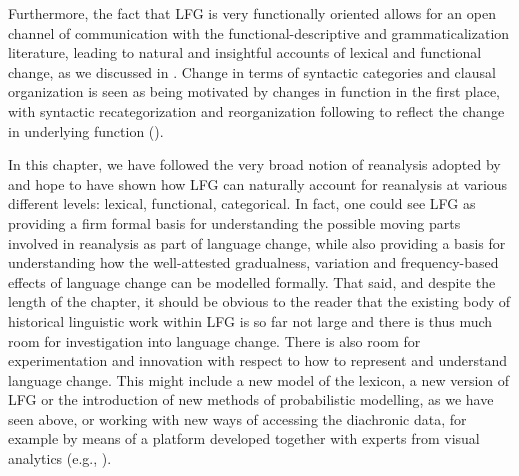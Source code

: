 \documentclass[output=paper,hidelinks]{langscibook}
\begin{document}
Furthermore, the fact that LFG is very functionally oriented allows for an open channel of communication with the functional-descriptive and grammaticalization literature, leading to natural and insightful  accounts of lexical and functional change, as we discussed in . Change in terms of syntactic categories and clausal organization is seen as being motivated by changes in function in the first place, with syntactic recategorization and reorganization following to reflect the change in underlying function ().


In this chapter, we have followed the very broad notion of reanalysis adopted by \citet{harris1995historical} and hope to have shown how LFG can naturally account for reanalysis at various different levels: lexical, functional, categorical. In fact, one could see LFG as providing a firm formal basis for understanding the possible moving parts involved in reanalysis as part of language change, while also providing a basis for  understanding how the well-attested gradualness, variation and frequency-based effects of language change can be modelled formally.  That said, and despite the length of the chapter, it should be obvious to the reader that the existing body of historical linguistic work within LFG is so far not large and there is thus much room for investigation into language change.  There is also room for experimentation and innovation with respect to how to represent and understand language change. This might include a new model of the lexicon, a new version of LFG or the introduction of new methods of probabilistic modelling, as we have seen above, or working with new ways of accessing the diachronic data, for example by means of a platform developed together with experts from visual analytics  (e.g., \citealp{schatzle-etal-2019-visualizing,beck2020visual,beck-etal-2020-representation}). 

\sloppy
\printbibliography[heading=subbibliography,notkeyword=this]
\end{document}
